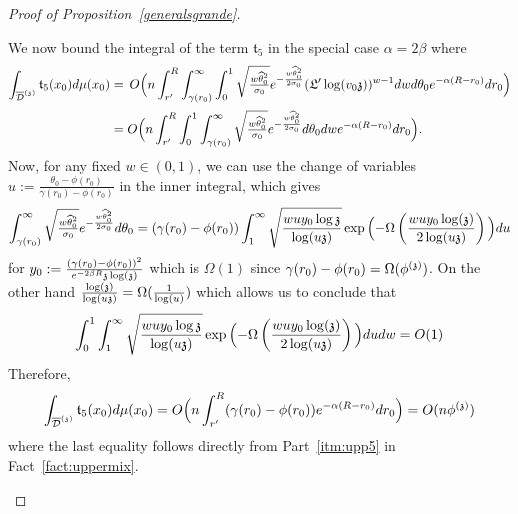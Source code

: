 \begin{proof}[Proof of Proposition~\ref{generalsgrande}]
\begin{itemize}
\medskip
We now bound the integral of the term $\mathfrak{t}_5$ in the special case $\alpha=2\beta$ where
\begin{align*}\int_{\ndt}\mathfrak{t}_5(x_0)d\mu(x_0)&=\,O\Big(n\int_{r'}^R \int_{\gamma(r_0)}^\infty\int_{0}^{1}\sqrt{\tfrac{w\hatt^2}{\sigma_0}}e^{-\frac{w\hatt^2}{2\sigma_0}}(\auxl'\log(v_0\ss))^{w-1}dwd\theta_0e^{-\alpha(R-r_0)}dr_0\Big)\\[2pt]&=O\Big(n\int_{r'}^R \int_{0}^{1}\int_{\gamma(r_0)}^\infty\sqrt{\tfrac{w\hatt^2}{\sigma_0}}e^{-\frac{w\hatt^2}{2\sigma_0}}d\theta_0dwe^{-\alpha(R-r_0)}dr_0\Big).\end{align*}
Now, for any fixed $w\in(0,1)$, we can use the change of variables $u:=\frac{\theta_0-\phi(r_0)}{\gamma(r_0)-\phi(r_0)}$ in the inner integral, which gives
\[\int_{\gamma(r_0)}^\infty\sqrt{\tfrac{w\hatt^2}{\sigma_0}}e^{-\frac{w\hatt^2}{2\sigma_0}}d\theta_0=(\gamma(r_0)-\phi(r_0))\int_{1}^\infty\sqrt{\frac{wuy_0\log\ss}{\log(u\ss)}}\exp\Big({-}\Omega\left(\frac{wuy_0\log(\ss)}{2\log(u\ss)}\right)\Big)du\]
for $y_0:=\frac{(\gamma(r_0)-\phi(r_0))^2}{e^{-2\beta R}\ss\log(\ss)}$ which is $\Omega(1)$ since $\gamma(r_0)-\phi(r_0)=\Omega(\phis)$. On the other hand $\frac{\log(\ss)}{\log(u\ss)}=\Omega(\frac{1}{\log(u)})$ which allows us to conclude that
\[\int_0^1\int_{1}^\infty\sqrt{\frac{wuy_0\log\ss}{\log(u\ss)}}\exp\Big({-}\Omega\left(\frac{wuy_0\log(\ss)}{2\log(u\ss)}\right)\Big)dudw=O(1)\]
Therefore,
\[\int_{\ndt}\mathfrak{t}_5(x_0)d\mu(x_0)=O\Big(n\int_{r'}^R(\gamma(r_0)-\phi(r_0))e^{-\alpha(R-r_0)}dr_0\Big)=O(n\phis)\]
where the last equality follows directly from Part~\eqref{itm:upp5} in Fact~\ref{fact:uppermix}.
\end{itemize}
\end{proof}







